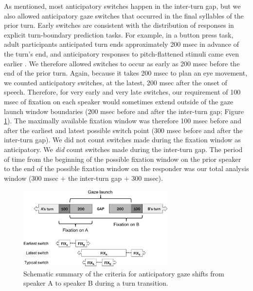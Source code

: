 \documentclass[authoryear, 12pt]{elsarticle}
\begin{document}
As mentioned, most anticipatory switches happen in the inter-turn gap, but we also allowed anticipatory gaze switches that occurred in the final syllables of the prior turn. Early switches are consistent with the distribution of responses in explicit turn-boundary prediction tasks. For example, in a button press task, adult participants anticipated turn ends approximately 200 msec in advance of the turn's end, and anticipatory responses to pitch-flattened stimuli came even earlier \citep{de-ruiter2006}. We therefore allowed switches to occur as early as 200 msec before the end of the prior turn. Again, because it takes 200 msec to plan an eye movement, we counted anticipatory switches, at the latest, 200 msec after the onset of speech. Therefore, for very early and very late switches, our requirement of 100 msec of fixation on each speaker would sometimes extend outside of the gaze launch window boundaries (200 msec before and after the inter-turn gap; Figure \ref{fig:criterion}). The maximally available fixation window was therefore 100 msec before and after the earliest and latest possible switch point (300 msec before and after the inter-turn gap). We did not count switches made during the fixation window as anticipatory. We \textit{did} count switches made during the inter-turn gap. The period of time from the beginning of the possible fixation window on the prior speaker to the end of the possible fixation window on the responder was our total analysis window (300 msec $+$ the inter-turn gap $+$ 300 msec).

\begin{figure}[t]
\begin{center}
\includegraphics[width=0.7\textwidth]{figures/FIG-AnticipCriteria.png}
\end{center}
\caption{Schematic summary of the criteria for anticipatory gaze shifts from speaker A to speaker B during a turn transition.} 
\label{fig:criterion}
\end{figure}
\end{document}
